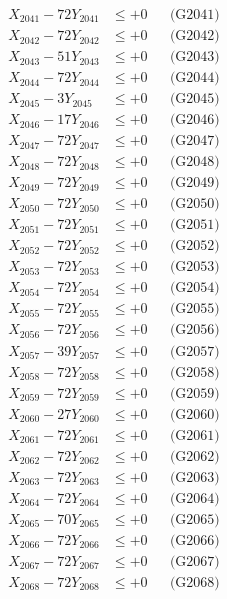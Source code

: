 \documentclass[a4paper,10pt]{article}
\begin{document}
{\begin{align}
\allowbreak
X_{2041} - 72Y_{2041} &\leq +0 && \text{(G2041)} \\
X_{2042} - 72Y_{2042} &\leq +0 && \text{(G2042)} \\
X_{2043} - 51Y_{2043} &\leq +0 && \text{(G2043)} \\
X_{2044} - 72Y_{2044} &\leq +0 && \text{(G2044)} \\
X_{2045} - 3Y_{2045} &\leq +0 && \text{(G2045)} \\
X_{2046} - 17Y_{2046} &\leq +0 && \text{(G2046)} \\
X_{2047} - 72Y_{2047} &\leq +0 && \text{(G2047)} \\
X_{2048} - 72Y_{2048} &\leq +0 && \text{(G2048)} \\
X_{2049} - 72Y_{2049} &\leq +0 && \text{(G2049)} \\
X_{2050} - 72Y_{2050} &\leq +0 && \text{(G2050)} \\
\allowbreak
X_{2051} - 72Y_{2051} &\leq +0 && \text{(G2051)} \\
X_{2052} - 72Y_{2052} &\leq +0 && \text{(G2052)} \\
X_{2053} - 72Y_{2053} &\leq +0 && \text{(G2053)} \\
X_{2054} - 72Y_{2054} &\leq +0 && \text{(G2054)} \\
X_{2055} - 72Y_{2055} &\leq +0 && \text{(G2055)} \\
X_{2056} - 72Y_{2056} &\leq +0 && \text{(G2056)} \\
X_{2057} - 39Y_{2057} &\leq +0 && \text{(G2057)} \\
X_{2058} - 72Y_{2058} &\leq +0 && \text{(G2058)} \\
X_{2059} - 72Y_{2059} &\leq +0 && \text{(G2059)} \\
X_{2060} - 27Y_{2060} &\leq +0 && \text{(G2060)} \\
\allowbreak
X_{2061} - 72Y_{2061} &\leq +0 && \text{(G2061)} \\
X_{2062} - 72Y_{2062} &\leq +0 && \text{(G2062)} \\
X_{2063} - 72Y_{2063} &\leq +0 && \text{(G2063)} \\
X_{2064} - 72Y_{2064} &\leq +0 && \text{(G2064)} \\
X_{2065} - 70Y_{2065} &\leq +0 && \text{(G2065)} \\
X_{2066} - 72Y_{2066} &\leq +0 && \text{(G2066)} \\
X_{2067} - 72Y_{2067} &\leq +0 && \text{(G2067)} \\
X_{2068} - 72Y_{2068} &\leq +0 && \text{(G2068)} \\

\end{align}}
\end{document}

